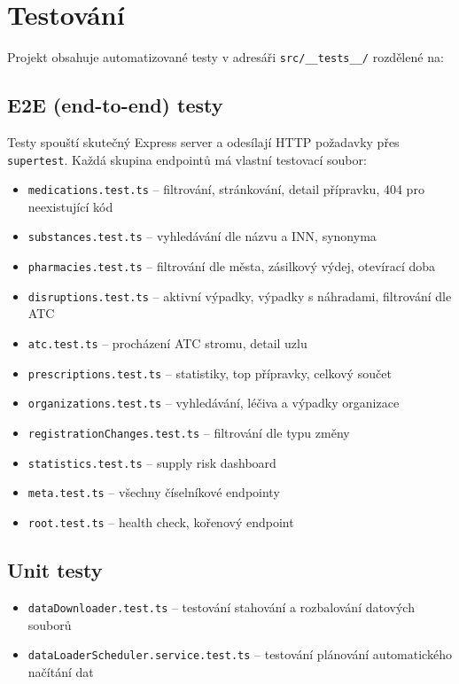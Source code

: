 \documentclass[12pt,a4paper]{article}
\begin{document}
\section{Testování}

Projekt obsahuje automatizované testy v adresáři \texttt{src/\_\_tests\_\_/} rozdělené na:

\subsection{E2E (end-to-end) testy}

Testy spouští skutečný Express server a odesílají HTTP požadavky přes \texttt{supertest}. Každá skupina endpointů má vlastní testovací soubor:

\begin{itemize}
  \item \texttt{medications.test.ts} -- filtrování, stránkování, detail přípravku, 404 pro neexistující kód
  \item \texttt{substances.test.ts} -- vyhledávání dle názvu a INN, synonyma
  \item \texttt{pharmacies.test.ts} -- filtrování dle města, zásilkový výdej, otevírací doba
  \item \texttt{disruptions.test.ts} -- aktivní výpadky, výpadky s náhradami, filtrování dle ATC
  \item \texttt{atc.test.ts} -- procházení ATC stromu, detail uzlu
  \item \texttt{prescriptions.test.ts} -- statistiky, top přípravky, celkový součet
  \item \texttt{organizations.test.ts} -- vyhledávání, léčiva a výpadky organizace
  \item \texttt{registrationChanges.test.ts} -- filtrování dle typu změny
  \item \texttt{statistics.test.ts} -- supply risk dashboard
  \item \texttt{meta.test.ts} -- všechny číselníkové endpointy
  \item \texttt{root.test.ts} -- health check, kořenový endpoint

\end{itemize}

\subsection{Unit testy}

\begin{itemize}
  \item \texttt{dataDownloader.test.ts} -- testování stahování a rozbalování datových souborů
  \item \texttt{dataLoaderScheduler.service.test.ts} -- testování plánování automatického načítání dat
\end{itemize}
\end{document}
